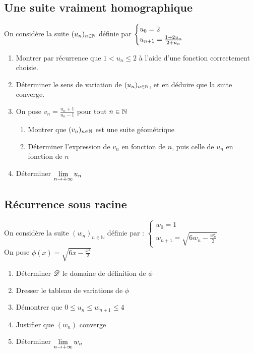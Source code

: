 \documentclass[oneside,12pt]{book}          %
\begin{document}
\subsection{Une suite vraiment homographique}
On considère la suite ${(u_{n})_{n\in\mathbb N}}$ définie par $\defsuite{u_0=2}{\frac{1+2u_n}{2+u_n}}$ 
\begin{enumerate}
    \item Montrer par récurrence que $1<u_n\leq2$ à l'aide d'une fonction correctement choisie.
    \item Déterminer le sens de variation de ${(u_{n})_{n\in\mathbb N}}$, et en déduire que la suite converge.
    \item On pose $v_n=\frac{u_n+1}{u_n-1}$ pour tout ${n\in\mathbb N}$
    \begin{enumerate}
        \item Montrer que $(v_n)_{{n\in\mathbb N}}$ est une suite géométrique
        \item Déterminer l'expression de $v_n$ en fonction de $n$, puis celle de $u_n$ en fonction de $n$
    \end{enumerate}
    \item Déterminer ${\lim\limits_{n\to +\infty}}\, u_n$
\end{enumerate}



\subsection{Récurrence sous racine}
On considère la suite $(w_n)_{n \in \mathbb{N}}$ définie par : $\begin{cases}w_0 = 1\\w_{n+1}=\sqrt{6 w_n - \frac{w_n^2}{2}}\end{cases}$\\
On pose $\phi(x) = \sqrt{6x - \frac{x^2}{2}}$
\begin{enumerate}
    \item Déterminer ${\mathscr{D}}$ le domaine de définition de $\phi$
    \item Dresser le tableau de variations de $\phi$
    \item Démontrer que $0 \leq u_n \leq w_{n+1} \leq 4$
    \item Justifier que $(w_n)$ converge
    \item Déterminer ${\lim\limits_{\substack{n \to +\infty}}}\, w_n$
\end{enumerate}
\end{document}
